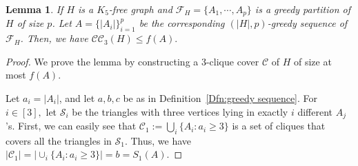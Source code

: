 \documentclass[11pt,a4paper]{article}
\newtheorem{lem}[dfn]{Lemma}
\newcommand{\dC}{{\mathcal{C}}}
\newcommand{\dF}{{\mathcal{F}}}
\newcommand{\dS}{{\mathcal{S}}}
\newcommand{\coveropt}[2]{{\mathcal{C}\mathcal{C}_{#1}(#2)}}
\begin{document}

\begin{lem}\label{Lem:Bound of 3-clique cover by f(A)}
     If $H$ is a $K_5$-free graph and $\dF_H=\{A_1,\cdots,A_p \}$ is a greedy partition of $H$ of size $p$.  
     Let $A=\{|A_i|\}_{i=1}^{p}$ be the corresponding $(|H|,p)$-greedy sequence of $\dF_H$.
     Then, we have 
	$\coveropt{3}{H}\leq f(A).$
\end{lem}
\begin{proof}
We prove the lemma by constructing a 3-clique cover $\dC$ of $H$ of size at most $f(A).$

Let $a_i = |A_i|$, and let $a,b,c$ be as in Definition~\ref{Dfn:greedy sequence}. 
For $i\in[3],$ let $\dS_i$ be the triangles with three vertices lying in exactly $i$ different $A_j$'s.
First, we can easily see that  $\dC_1:=\bigcup_{i}\{A_i: a_i\geq 3\}$ is a set of cliques that covers all the triangles in $\dS_1.$
Thus, we have $|\dC_1|=|\cup_{i}\{A_i: a_i\geq 3\}|=b=S_1(A).$


\end{proof}
\end{document}
